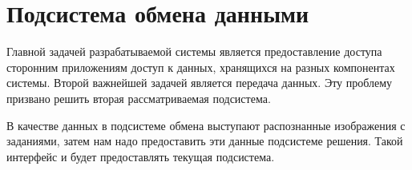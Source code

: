 \section{Подсистема обмена данными}

Главной задачей разрабатываемой системы является предоставление доступа сторонним приложениям доступ к данных, хранящихся на разных компонентах системы. Второй важнейшей задачей является передача данных. Эту проблему призвано решить вторая рассматриваемая подсистема.

В качестве данных в подсистеме обмена выступают распознанные изображения с заданиями, затем нам надо предоставить эти данные подсистеме решения. Такой интерфейс и будет предоставлять текущая подсистема.



